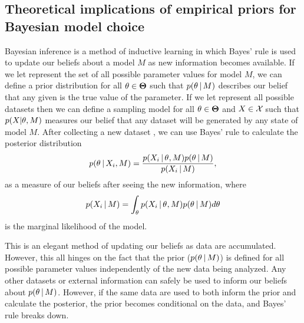 \subsection*{Theoretical implications of empirical priors for Bayesian model
choice}
\begin{linenomath}
Bayesian inference is a method of inductive learning in which Bayes' rule is
used to update our beliefs about a model $M$ as new information becomes
available.
If we let \allParameterValues represent the set of all possible parameter
values for model $M$, we can define a prior distribution for all $\theta \in
\boldsymbol{\Theta}$ such that $p(\theta \,|\, M)$ describes our belief that
any given \myTheta{} is the true value of the parameter.
If we let \allDatasets represent all possible datasets then we can 
define a sampling model for all $\theta \in
\boldsymbol{\Theta}$ and $\alignment{}{} \in \allDatasets$ such that
$p(\alignment{}{} | \theta, M)$ measures our belief that any dataset \alignment{}{}
will be generated by any state \myTheta{} of model $M$.
After collecting a new dataset , we can use Bayes' rule to
calculate the posterior distribution
\begin{equation}
    p(\myTheta{} \given \alignment{i}{}, M) = \frac{p(\alignment{i}{} \given
    \myTheta{}, M)p(\myTheta{} \given M)}{p(\alignment{i}{} \given M)},
    \label{eq:bayesrule}
\end{equation}
as a measure of our beliefs after seeing the new information, where
\begin{equation}
    p(\alignment{i}{} \given M) = \int_{\myTheta{}} p(\alignment{i}{} \given
    \myTheta{}, M)p(\myTheta{} \given M) d\myTheta{}
    \label{eq:marginallikelhiood}
\end{equation}
is the marginal likelihood of the model.
\end{linenomath}

This is an elegant method of updating our beliefs as data are accumulated.
However, this all hinges on the fact that the prior ($p(\theta_{} \,|\, M)$)
is defined for all possible parameter values independently of the new data
being analyzed.
Any other datasets or external information can safely be used to inform our
beliefs about $p(\theta_{} \,|\, M)$.
However, if the same data are used to both inform the prior and calculate the
posterior, the prior becomes conditional on the data, and Bayes' rule breaks
down.

